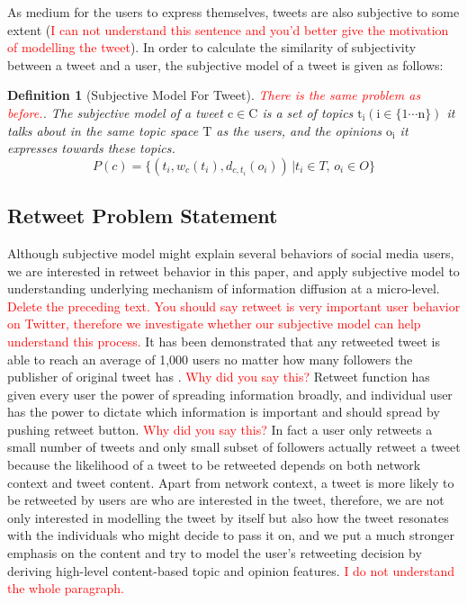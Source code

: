 \documentclass{acm_proc_article-sp}
\newtheorem{definition}{Definition}
\newcommand{\mo}[1]{\textcolor{red}{#1}}
\begin{document}
As medium for the users to express themselves, tweets are also subjective to some extent (\mo{I can not understand this sentence and you'd better give the motivation of modelling the tweet}). In order to calculate the similarity of subjectivity between a  tweet and a user, the subjective model of a tweet is given as follows:

\begin{definition}[Subjective Model For Tweet] \mo{There is the same problem as before.}. 
The subjective model of a tweet $\mathrm{c \in C}$ is a set of topics $\mathrm{t_{i} \left( i \in \lbrace1 \cdots n \rbrace \right) }$ it talks about in the same topic space $\mathrm{T}$ as the users, and the opinions $\mathrm{o_{i}}$ it expresses towards these topics.
\begin{equation}
\label{tweetmodel}
P \left( c \right) = \lbrace \left( t_{i}, w_{c} \left( t_{i} \right), d_{c,t_{i}} \left( o_{i} \right) \right) \,\vert  t_{i} \in T, \, o_{i} \in O \rbrace
\end{equation}
\end{definition}

\subsection{Retweet Problem Statement}
\label{statement}
Although subjective model might explain several behaviors of social media users, we are interested in retweet behavior in this paper, and apply subjective model to understanding underlying mechanism of information diffusion at a micro-level. \mo{Delete the preceding text. You should say retweet is very important user behavior on Twitter, therefore we investigate whether our subjective model can help understand this process.} 
It has been demonstrated that any retweeted tweet is able to reach an average of 1,000 users no matter how many followers the publisher of original tweet has \cite{Kwak:2010TSN}. \mo{Why did you say this?} 
Retweet function has given every user the power of spreading information broadly, and individual user has the power to dictate which information is important and should spread by pushing retweet button. \mo{Why did you say this?} 
In fact a user only retweets a small number of tweets and only small subset of followers actually retweet a tweet because the likelihood of a tweet to be retweeted depends on both network context and tweet content. 
Apart from network context, a tweet is more likely to be retweeted by users are who are interested in the tweet, therefore, we are not only interested in modelling the tweet by itself but also how the tweet resonates with the individuals who might decide to pass it on, and we put a much stronger emphasis on the content and try to model the user's retweeting decision by deriving high-level content-based topic and opinion features. \mo{I do not understand the whole paragraph.} 
\end{document}
